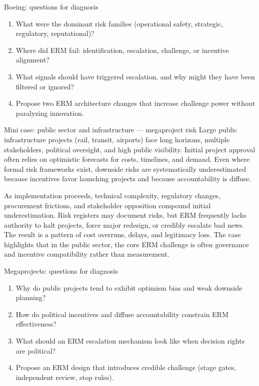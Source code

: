 \documentclass[aspectratio=169, 10pt]{beamer} %
\begin{document}
\begin{frame}{Boeing: questions for diagnosis}
\begin{enumerate}
  \item What were the dominant risk families (operational safety, strategic, regulatory, reputational)?
  \item Where did ERM fail: identification, escalation, challenge, or incentive alignment?
  \item What signals should have triggered escalation, and why might they have been filtered or ignored?
  \item Propose two ERM architecture changes that increase challenge power without paralyzing innovation.
\end{enumerate}
\end{frame}

\begin{frame}{Mini case: public sector and infrastructure — megaproject risk}
Large public infrastructure projects (rail, transit, airports) face long horizons,
multiple stakeholders, political oversight, and high public visibility. Initial project
approval often relies on optimistic forecasts for costs, timelines, and demand. Even
where formal risk frameworks exist, downside risks are systematically underestimated
because incentives favor launching projects and because accountability is diffuse.

As implementation proceeds, technical complexity, regulatory changes, procurement
frictions, and stakeholder opposition compound initial underestimation. Risk registers
may document risks, but ERM frequently lacks authority to halt projects, force major
redesign, or credibly escalate bad news. The result is a pattern of cost overruns,
delays, and legitimacy loss. The case highlights that in the public sector, the core
ERM challenge is often governance and incentive compatibility rather than measurement.
\end{frame}

\begin{frame}{Megaprojects: questions for diagnosis}
\begin{enumerate}
  \item Why do public projects tend to exhibit optimism bias and weak downside planning?
  \item How do political incentives and diffuse accountability constrain ERM effectiveness?
  \item What should an ERM escalation mechanism look like when decision rights are political?
  \item Propose an ERM design that introduces credible challenge (stage gates, independent review, stop rules).
\end{enumerate}
\end{frame}
\end{document}

